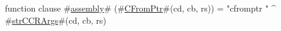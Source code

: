 function clause #\hyperref[sailMIPSzassembly]{assembly}# (#\hyperref[sailMIPSzCFromPtr]{CFromPtr}#(cd, cb, rs)) = "cfromptr " ^ #\hyperref[sailMIPSzstrCCRArgs]{strCCRArgs}#(cd, cb, rs)
